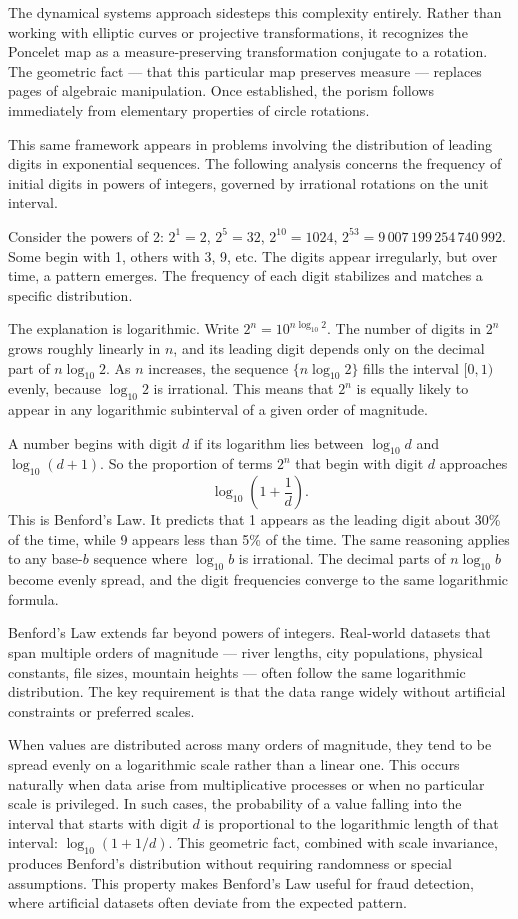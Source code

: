 The dynamical systems approach sidesteps this complexity entirely. Rather than working with elliptic curves or projective transformations, it recognizes the Poncelet map as a measure-preserving transformation conjugate to a rotation. The geometric fact — that this particular map preserves measure — replaces pages of algebraic manipulation. Once established, the porism follows immediately from elementary properties of circle rotations.

This same framework appears in problems involving the distribution of leading digits in exponential sequences. The following analysis concerns the frequency of initial digits in powers of integers, governed by irrational rotations on the unit interval.

Consider the powers of 2: $2^1 = 2$, $2^5 = 32$, $2^{10} = 1024$, $2^{53} = 9{\,}007{\,}199{\,}254{\,}740{\,}992$. Some begin with 1, others with 3, 9, etc. The digits appear irregularly, but over time, a pattern emerges. The frequency of each digit stabilizes and matches a specific distribution.

The explanation is logarithmic. Write $2^n = 10^{n \log_{10} 2}$. The number of digits in $2^n$ grows roughly linearly in $n$, and its leading digit depends only on the decimal part of $n \log_{10} 2$. As $n$ increases, the sequence $\{ n \log_{10} 2 \}$ fills the interval $[0,1)$ evenly, because $\log_{10} 2$ is irrational. This means that $2^n$ is equally likely to appear in any logarithmic subinterval of a given order of magnitude.

A number begins with digit $d$ if its logarithm lies between $\log_{10} d$ and $\log_{10}(d+1)$. So the proportion of terms $2^n$ that begin with digit $d$ approaches
\[
\log_{10}\left(1 + \frac{1}{d}\right).
\]
This is Benford’s Law. It predicts that 1 appears as the leading digit about 30\% of the time, while 9 appears less than 5\% of the time. The same reasoning applies to any base-$b$ sequence where $\log_{10} b$ is irrational. The decimal parts of $n \log_{10} b$ become evenly spread, and the digit frequencies converge to the same logarithmic formula.

Benford's Law extends far beyond powers of integers. Real-world datasets that span multiple orders of magnitude — river lengths, city populations, physical constants, file sizes, mountain heights — often follow the same logarithmic distribution. The key requirement is that the data range widely without artificial constraints or preferred scales.

When values are distributed across many orders of magnitude, they tend to be spread evenly on a logarithmic scale rather than a linear one. This occurs naturally when data arise from multiplicative processes or when no particular scale is privileged. In such cases, the probability of a value falling into the interval that starts with digit $d$ is proportional to the logarithmic length of that interval: $\log_{10}(1 + 1/d)$. This geometric fact, combined with scale invariance, produces Benford's distribution without requiring randomness or special assumptions. This property makes Benford's Law useful for fraud detection, where artificial datasets often deviate from the expected pattern.

